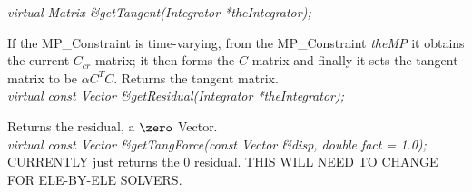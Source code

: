 {\em virtual Matrix \&getTangent(Integrator *theIntegrator);} 

If the MP\_Constraint is time-varying, from the MP\_Constraint
{\em theMP} it obtains the current $C_{cr}$ matrix; it then forms the
$C$ matrix and finally it sets the tangent matrix to be $\alpha
C^TC$. Returns the tangent matrix. \\

{\em virtual const Vector \&getResidual(Integrator *theIntegrator);} 

Returns the residual, a $\zero$ Vector. \\

{\em virtual const Vector \&getTangForce(const Vector \&disp, double
fact = 1.0);    }\\
CURRENTLY just returns the $0$ residual. THIS WILL NEED TO CHANGE FOR
ELE-BY-ELE SOLVERS. 

